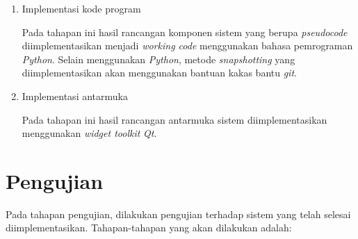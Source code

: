 \begin{enumerate}[
leftmargin=0pt, itemindent=20pt,
labelwidth=15pt, labelsep=5pt, listparindent=0.7cm,
align=left]

\item Implementasi kode program

  Pada tahapan ini hasil rancangan komponen sistem yang berupa \emph{pseudocode}
  diimplementasikan menjadi \emph{working code} menggunakan bahasa pemrograman
  \emph{Python}. Selain menggunakan \emph{Python}, metode \emph{snapshotting}
  yang diimplementasikan akan menggunakan bantuan kakas bantu \emph{git}.
\newpage %
\item Implementasi antarmuka

  Pada tahapan ini hasil rancangan antarmuka sistem diimplementasikan
  menggunakan \emph{widget toolkit} \emph{Qt}.

\end{enumerate}

\section{Pengujian}


Pada tahapan pengujian, dilakukan pengujian terhadap sistem yang telah
selesai diimplementasikan. Tahapan-tahapan yang akan dilakukan adalah:

